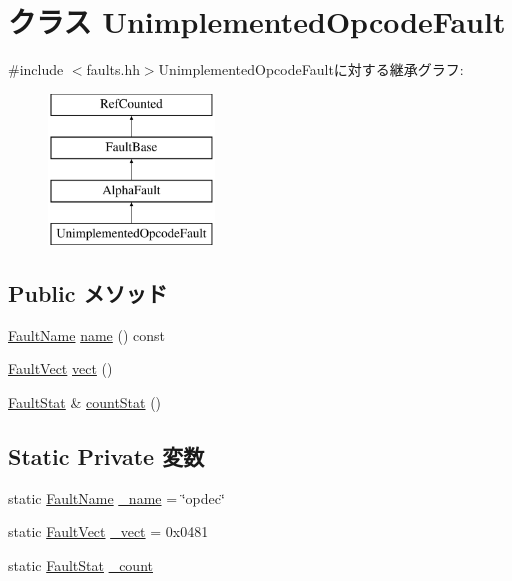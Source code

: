 \hypertarget{classAlphaISA_1_1UnimplementedOpcodeFault}{
\section{クラス UnimplementedOpcodeFault}
\label{classAlphaISA_1_1UnimplementedOpcodeFault}
}


{\ttfamily \#include $<$faults.hh$>$}UnimplementedOpcodeFaultに対する継承グラフ:\begin{figure}[H]
\begin{center}
\leavevmode
\includegraphics[height=4cm]{classAlphaISA_1_1UnimplementedOpcodeFault}
\end{center}
\end{figure}
\subsection*{Public メソッド}
\begin{DoxyCompactItemize}
\item 
\hyperlink{sim_2faults_8hh_abb196df64725e5c2568c900cf130d8d7}{FaultName} \hyperlink{classAlphaISA_1_1UnimplementedOpcodeFault_a73adb23259baf912a81683a9790a303f}{name} () const 
\item 
\hyperlink{classm5_1_1params_1_1Addr}{FaultVect} \hyperlink{classAlphaISA_1_1UnimplementedOpcodeFault_ae15c5d7ab0162821b93d668d0b225198}{vect} ()
\item 
\hyperlink{classStats_1_1Scalar}{FaultStat} \& \hyperlink{classAlphaISA_1_1UnimplementedOpcodeFault_a6c79663c761ff57265459f7e3aefaf4c}{countStat} ()
\end{DoxyCompactItemize}
\subsection*{Static Private 変数}
\begin{DoxyCompactItemize}
\item 
static \hyperlink{sim_2faults_8hh_abb196df64725e5c2568c900cf130d8d7}{FaultName} \hyperlink{classAlphaISA_1_1UnimplementedOpcodeFault_ac79073ffcd2c66a09bcd3bd3ad206019}{\_\-name} = \char`\"{}opdec\char`\"{}
\item 
static \hyperlink{classm5_1_1params_1_1Addr}{FaultVect} \hyperlink{classAlphaISA_1_1UnimplementedOpcodeFault_ad9e5855b9db0b2824cf6c507be4a872e}{\_\-vect} = 0x0481
\item 
static \hyperlink{classStats_1_1Scalar}{FaultStat} \hyperlink{classAlphaISA_1_1UnimplementedOpcodeFault_a4bff925c412f331c5aaf6a39b79619ff}{\_\-count}
\end{DoxyCompactItemize}



